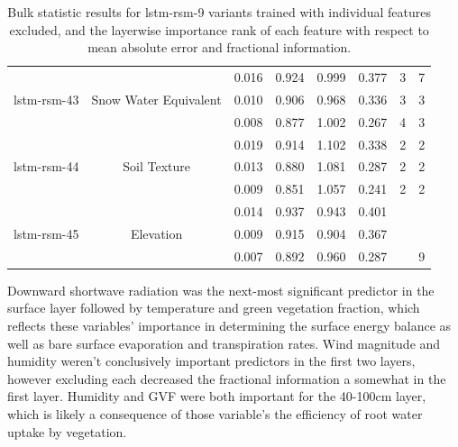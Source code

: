 \begin{table}[H]
\begin{tabular}{c|c|c|c|c|c|c|c }
\hline
        \multirow{3}{6em}{lstm-rsm-43} & \multirow{3}{8em}{Snow Water Equivalent} & 0.016 & 0.924 & 0.999 & 0.377 & 3 & 7 \\ & & 0.010 & 0.906 & 0.968 & 0.336 & 3 & 3 \\ & & 0.008 & 0.877 & 1.002 & 0.267 & 4 & 3 \\
\hline
        \multirow{3}{6em}{lstm-rsm-44} & \multirow{3}{8em}{Soil Texture} & 0.019 & 0.914 & 1.102 & 0.338 & 2 & 2 \\ & & 0.013 & 0.880 & 1.081 & 0.287 & 2 & 2 \\ & & 0.009 & 0.851 & 1.057 & 0.241 & 2 & 2 \\
\hline
        \multirow{3}{6em}{lstm-rsm-45} & \multirow{3}{8em}{Elevation} & 0.014 & 0.937 & 0.943 & 0.401 & & \\ & & 0.009 & 0.915 & 0.904 & 0.367 & & \\ & & 0.007 & 0.892 & 0.960 & 0.287 & & 9 \\
\end{tabular}
    \caption{Bulk statistic results for lstm-rsm-9 variants trained with individual features excluded, and the layerwise importance rank of each feature with respect to mean absolute error and fractional information.}
    \label{feat-variants-table-1}
\end{table}

Downward shortwave radiation was the next-most significant predictor in the surface layer followed by temperature and green vegetation fraction, which reflects these variables' importance in determining the surface energy balance as well as bare surface evaporation and transpiration rates. Wind magnitude and humidity weren't conclusively important predictors in the first two layers, however excluding each decreased the fractional information a somewhat in the first layer. Humidity and GVF were both important for the 40-100cm layer, which is likely a consequence of those variable's the efficiency of root water uptake by vegetation.

